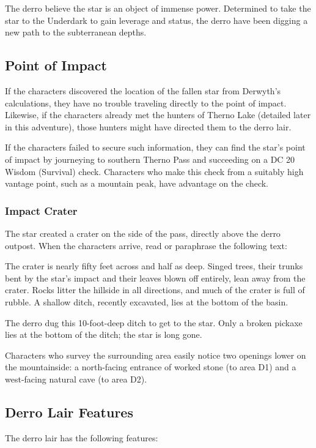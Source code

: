 \documentclass[10pt,a4paper,twoside,bg=print,twocolumn,openany,nodeprecatedcode]{dndbook}
\begin{document}
The derro believe the star is an object of immense power. Determined to take the star to the Underdark to gain leverage and status, the derro have been digging a new path to the subterranean depths.

\subsection{Point of Impact}
If the characters discovered the location of the fallen star from Derwyth's calculations, they have no trouble traveling directly to the point of impact. Likewise, if the characters already met the hunters of Therno Lake (detailed later in this adventure), those hunters might have directed them to the derro lair.

If the characters failed to secure such information, they can find the star's point of impact by journeying to southern Therno Pass and succeeding on a DC 20 Wisdom (Survival) check. Characters who make this check from a suitably high vantage point, such as a mountain peak, have advantage on the check.

\subsubsection{Impact Crater}
The star created a crater on the side of the pass, directly above the derro outpost. When the characters arrive, read or paraphrase the following text:

\begin{DndReadAloud}{}
The crater is nearly fifty feet across and half as deep. Singed trees, their trunks bent by the star's impact and their leaves blown off entirely, lean away from the crater. Rocks litter the hillside in all directions, and much of the crater is full of rubble. A shallow ditch, recently excavated, lies at the bottom of the basin.

\end{DndReadAloud}

The derro dug this 10-foot-deep ditch to get to the star. Only a broken pickaxe lies at the bottom of the ditch; the star is long gone.

Characters who survey the surrounding area easily notice two openings lower on the mountainside: a north-facing entrance of worked stone (to area D1) and a west-facing natural cave (to area D2).

\subsection{Derro Lair Features}
The derro lair has the following features:
\end{document}
